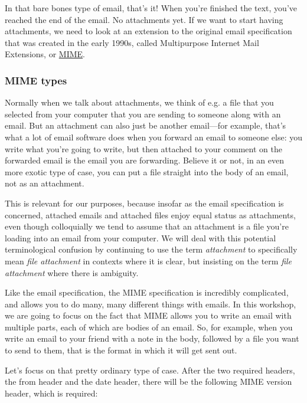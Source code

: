 \documentclass[11pt]{article}
\begin{document}
In that bare bones type of email, that's it!  When you're finished the
text, you've reached the end of the email.  No attachments yet.  If we
want to start having attachments, we need to look at an extension to
the original email specification that was created in the early 1990s,
called Multipurpose Internet Mail Extensions, or \href{https://datatracker.ietf.org/doc/html/rfc2045}{MIME}.

\subsubsection{MIME types}
\label{sec:orgb75fad2}

Normally when we talk about attachments, we think of e.g. a file that
you selected from your computer that you are sending to someone along
with an email.  But an attachment can also just be another email---for
example, that's what a lot of email software does when you forward an
email to someone else: you write what you're going to write, but then
attached to your comment on the forwarded email is the email you are
forwarding.  Believe it or not, in an even more exotic type of case,
you can put a file straight into the body of an email, not as an
attachment.

This is relevant for our purposes, because insofar as the email
specification is concerned, attached emails and attached files enjoy
equal status as attachments, even though colloquially we tend to
assume that an attachment is a file you're loading into an email from
your computer.  We will deal with this potential terminological
confusion by continuing to use the term \emph{attachment} to specifically
mean \emph{file attachment} in contexts where it is clear, but insisting on
the term \emph{file attachment} where there is ambiguity.

Like the email specification, the MIME specification is incredibly
complicated, and allows you to do many, many different things with
emails.  In this workshop, we are going to focus on the fact that MIME
allows you to write an email with multiple parts, each of which are
bodies of an email. So, for example, when you write an email to your
friend with a note in the body, followed by a file you want to send to
them, that is the format in which it will get sent out.

Let's focus on that pretty ordinary type of case. After the two
required headers, the from header and the date header, there will be
the following MIME version header, which is required:
\end{document}

